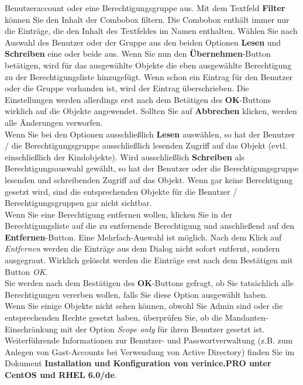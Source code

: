 \documentclass[a4paper,10pt]{book}
\begin{document}
Benutzeraccount oder eine Berechtigungsgruppe aus. Mit dem Textfeld \textbf{Filter} können Sie den Inhalt der Combobox filtern. Die Combobox enthält immer nur die Einträge, die den Inhalt des Textfeldes im Namen enthalten. Wählen Sie nach Auswahl des Benutzer oder der Gruppe aus den beiden Optionen \textbf{Lesen} und \textbf{Schreiben} eine oder beide aus. Wenn Sie nun den \textbf{Übernehmen}-Button betätigen, wird für das ausgewählte Objekte die eben ausgewählte Berechtigung
zu der Berechtigungsliste hinzugefügt. Wenn schon ein Eintrag für den Benutzer oder die Gruppe vorhanden ist, wird der Eintrag überschrieben. Die Einstellungen werden allerdings erst nach dem Betätigen des \textbf{OK}-Buttons wirklich auf die Objekte
angewendet. Sollten Sie auf \textbf{Abbrechen} klicken, werden alle Änderungen verworfen.
\newline\\
Wenn Sie bei den Optionen ausschließlich \textbf{Lesen} auswählen, so hat der Benutzer / die Berechtigungsgruppe ausschließlich lesenden Zugriff auf das Objekt (evtl. einschließlich der Kindobjekte). Wird ausschließlich \textbf{Schreiben} als Berechtigungsauswahl gewählt, so hat der Benutzer oder die Berechtigungsgruppe lesenden und schreibenden Zugriff auf das Objekt.
Wenn gar keine Berechtigung gesetzt wird, sind die entsprechenden Objekte für die Benutzer / Berechtigungsgruppen gar nicht sichtbar.
\newline\\
Wenn Sie eine Berechtigung entfernen wollen, klicken Sie in der Berechtigungsliste auf die zu entfernende Berechtigung und anschließend auf den
\textbf{Entfernen}-Button. Eine Mehrfach-Auswahl ist möglich. Nach dem Klick auf \textit{Entfernen} werden die Einträge aus dem Dialog nicht sofort entfernt, sondern ausgegraut. Wirklich gelöscht werden die Einträge erst nach dem Bestätigen mit Button \textit{OK}.
\newline\\
Sie werden nach dem Bestätigen des \textbf{OK}-Buttons gefragt, ob Sie tatsächlich alle Berechtigungen vererben wollen, falls Sie diese Option
ausgewählt haben.
\newline\\
Wenn Sie einige Objekte nicht sehen können, obwohl Sie Admin sind oder die entsprechenden Rechte gesetzt haben, überprüfen Sie, ob die
Mandanten-Einschränkung mit der Option \textit{Scope only} für ihren Benutzer gesetzt ist.
\newline\\
Weiterführende Informationen zur Benutzer- und Passwortverwaltung (z.B. zum Anlegen von Gast-Accounts bei Verwendung von Active Directory)
finden Sie im Dokument \textbf{Installation und Konfiguration von verinice.\textsc{PRO} unter CentOS und RHEL 6.0/de}.
\end{document}
